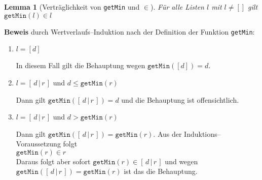\documentclass{article}
\newtheorem{Lemma}[Definition]{Lemma}
\begin{document}
\begin{Lemma}[Vertr\"aglichkeit von \texttt{getMin} und $\in$]
\label{l10}
F\"ur alle Listen $l$ mit $l\not = []$ gilt \\[0.1cm]
\hspace*{1.3cm} $\mathtt{getMin}(l) \in l$
\end{Lemma}
\textbf{Beweis} durch Wertverlaufs--Induktion nach der Definition der Funktion \texttt{getMin}:
\begin{enumerate}
\item $l = [d]$

      In diesem Fall gilt die Behauptung wegen $\mathtt{getMin}([d]) = d$.
\item $l = [\,d\,|\,r\,]$ und $d \leq \mathtt{getMin}(r)$

      Dann gilt $\mathtt{getMin}([\,d\,|\,r\,]) = d$ und die Behauptung ist offensichtlich.
\item $l = [\,d\,|\,r\,]$ und $d > \mathtt{getMin}(r)$

      Dann gilt $\mathtt{getMin}([\,d\,|\,r\,]) = \mathtt{getMin}(r)$.  Aus der
      Induktions--Voraussetzung folgt \\[0.1cm]
      \hspace*{1.3cm} $\mathtt{getMin}(r) \in r$ \\[0.1cm]
      Daraus folgt aber sofort $\mathtt{getMin}(r) \in [\,d\,|\,r\,]$ und wegen
       $\mathtt{getMin}([\,d\,|\,r\,]) = \mathtt{getMin}(r)$ ist das die Behauptung.
\end{enumerate}
\end{document}
